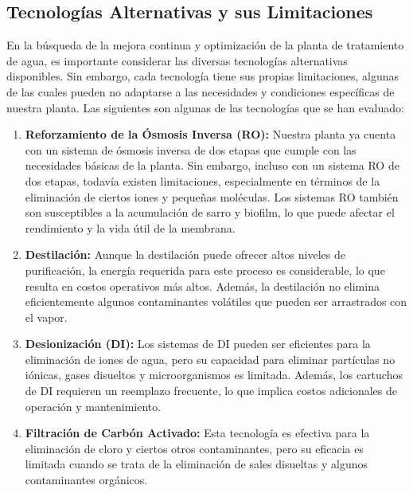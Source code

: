 \subsection{Tecnologías Alternativas y sus Limitaciones}

En la búsqueda de la mejora continua y optimización de la planta de tratamiento de agua,
es importante considerar las diversas tecnologías alternativas disponibles.
Sin embargo, cada tecnología tiene sus propias limitaciones, algunas de las
cuales pueden no adaptarse a las necesidades y condiciones específicas de nuestra planta.
Las siguientes son algunas de las tecnologías que se han evaluado:

\begin{enumerate}
    \item \textbf{Reforzamiento de la Ósmosis Inversa (RO):}  Nuestra planta ya cuenta con
          un sistema de ósmosis inversa de dos etapas que cumple con las necesidades
          básicas de la planta. Sin embargo, incluso con un sistema RO de dos etapas,
          todavía existen limitaciones, especialmente en términos de la eliminación de
          ciertos iones y pequeñas moléculas. Los sistemas RO también son susceptibles a
          la acumulación de sarro y biofilm, lo que puede afectar el rendimiento y
          la vida útil de la membrana.

    \item \textbf{Destilación:}  Aunque la destilación puede ofrecer altos niveles de
          purificación, la energía requerida para este proceso es considerable,
          lo que resulta en costos operativos más altos. Además, la destilación
          no elimina eficientemente algunos contaminantes volátiles que pueden ser arrastrados con el vapor.

    \item \textbf{Desionización (DI): } Los sistemas de DI pueden ser eficientes para
          la eliminación de iones de agua, pero su capacidad para eliminar
          partículas no iónicas, gases disueltos y microorganismos es limitada.
          Además, los cartuchos de DI requieren un reemplazo frecuente, lo que
          implica costos adicionales de operación y mantenimiento.

    \item \textbf{Filtración de Carbón Activado:}  Esta tecnología es efectiva para la
          eliminación de cloro y ciertos otros contaminantes, pero su eficacia es
          limitada cuando se trata de la eliminación de sales disueltas y
          algunos contaminantes orgánicos.

\end{enumerate}

